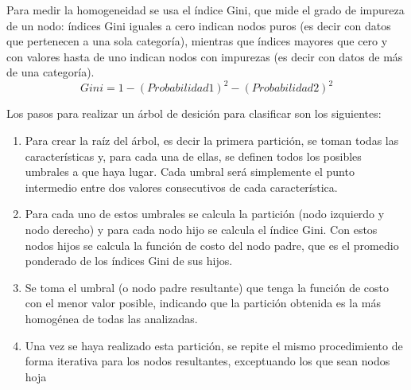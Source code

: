 \documentclass[conference]{IEEEtran}
\begin{document}
Para medir la homogeneidad se usa el índice Gini, que mide el grado de impureza de un nodo: índices Gini iguales a cero indican nodos puros (es decir con datos que pertenecen a una sola categoría), mientras que índices mayores que cero y con valores hasta de uno indican nodos con impurezas (es decir con datos de más de una categoría).
\begin{equation}
Gini=1-(Probabilidad 1)^2-(Probabilidad 2)^2
\end{equation}

Los pasos para realizar un árbol de desición para clasificar son los siguientes: 
\begin{enumerate}

\item Para crear la raíz del árbol, es decir la primera partición, se toman todas las características y, para cada una de ellas, se definen todos los posibles umbrales a que haya lugar. Cada umbral será simplemente el punto intermedio entre dos valores consecutivos de cada característica.

\item Para cada uno de estos umbrales se calcula la partición (nodo izquierdo y nodo derecho) y para cada nodo hijo se calcula el índice Gini. Con estos nodos hijos se calcula la función de costo del nodo padre, que es el promedio ponderado de los índices Gini de sus hijos.

\item Se toma el umbral (o nodo padre resultante) que tenga la función de costo con el menor valor posible, indicando que la partición obtenida es la más homogénea de todas las analizadas.

\item Una vez se haya realizado esta partición, se repite el mismo procedimiento de forma iterativa para los nodos resultantes, exceptuando los que sean nodos hoja
\end{enumerate}
\end{document}
